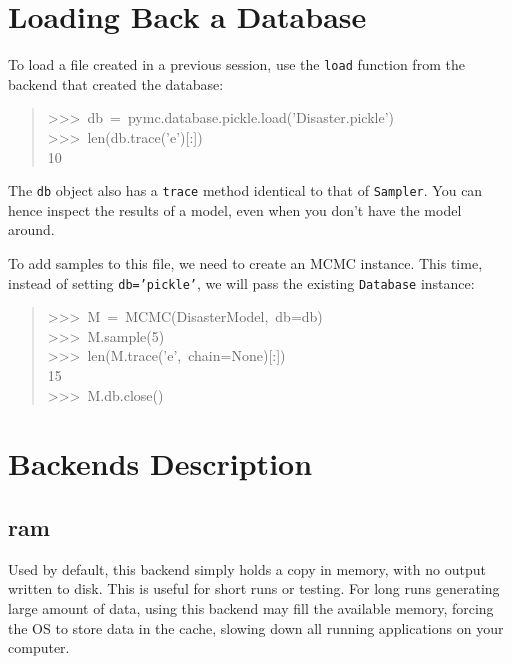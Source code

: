 
\hypertarget{loading-back-a-database}{}
\section{Loading Back a Database}
\label{loading-back-a-database}

To load a file created in a previous session, use the \texttt{load} function
from the backend that created the database:
\begin{quote}{\ttfamily \raggedright \noindent
>{}>{}>~db~=~pymc.database.pickle.load('Disaster.pickle')~\\
>{}>{}>~len(db.trace('e'){[}:{]})~\\
10
}\end{quote}

The \texttt{db} object also has a \texttt{trace} method identical to that of \texttt{Sampler}.
You can hence inspect the results of a model, even when you don't have the model
around.

To add samples to this file, we need to create an MCMC instance. This time,
instead of setting \texttt{db='pickle'}, we will pass the existing \texttt{Database}
instance:
\begin{quote}{\ttfamily \raggedright \noindent
>{}>{}>~M~=~MCMC(DisasterModel,~db=db)~\\
>{}>{}>~M.sample(5)~\\
>{}>{}>~len(M.trace('e',~chain=None){[}:{]})~\\
15~\\
>{}>{}>~M.db.close()
}\end{quote}



\hypertarget{backends-description}{}
\section{Backends Description}
\label{backends-description}



\hypertarget{ram}{}
\subsection{ram}
\label{ram}

Used by default, this backend simply holds a copy in memory, with no output
written to disk. This is useful for short runs or testing. For long runs
generating large amount of data, using this backend may fill the available
memory, forcing the OS to store data in the cache, slowing down all running
applications on your computer.


